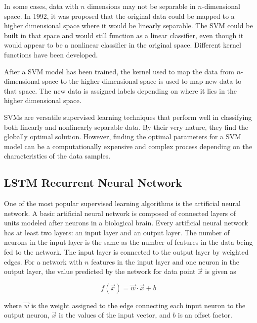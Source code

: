 In some cases, data with $n$ dimensions may not be separable in $n$-dimensional space. In 1992, it was proposed that the original data could be mapped to a higher dimensional space where it would be linearly separable. The SVM could be built in that space and would still function as a linear classifier, even though it would appear to be a nonlinear classifier in the original space. Different kernel functions have been developed. 

After a SVM model has been trained, the kernel used to map the data from $n$-dimensional space to the higher dimensional space is used to map new data to that space. The new data is assigned labels depending on where it lies in the higher dimensional space.  

SVMs are versatile supervised learning techniques that perform well in classifying both linearly and nonlinearly separable data. By their very nature, they find the globally optimal solution. However, finding the optimal parameters for a SVM model can be a computationally expensive and complex process depending on the characteristics of the data samples.

\subsection{LSTM Recurrent Neural Network}


One of the most popular supervised learning algorithms is the artificial neural network. A basic artificial neural network is composed of connected layers of units modeled after neurons in a biological brain. Every artificial neural network has at least two layers: an input layer and an output layer. The number of neurons in the input layer is the same as the number of features in the data being fed to the network. The input layer is connected to the output layer by weighted edges. For a network with $n$ features in the input layer and one neuron in the output layer, the value predicted by the network 
for data point $\vec{x}$ is given as

\begin{equation}
\label{ch4:eq:nn_01}
f(\vec{x}) = \vec{w} \cdot \vec{x} + b
\end{equation}

\noindent where $\vec{w}$ is the weight assigned to the edge connecting each input neuron to the output neuron, $\vec{x}$ is the values of the input vector, and $b$ is an offset factor.

